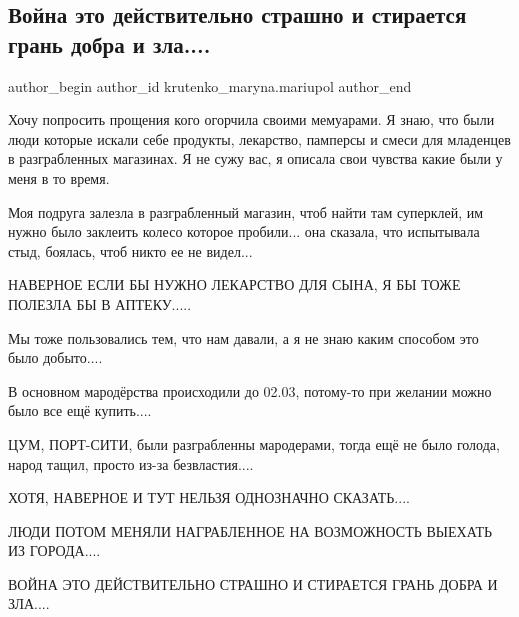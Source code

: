  
 
 
 
 

\subsection{Война это действительно страшно и стирается грань добра и зла....}
\label{sec:18_03_2023.fb.krutenko_maryna.mariupol.1.voina_eto_deistvitel}

\ifcmt
 author_begin
   author_id krutenko_maryna.mariupol
 author_end
\fi

Хочу попросить прощения кого огорчила своими мемуарами. Я знаю, что были люди
которые искали себе продукты, лекарство, памперсы и смеси для младенцев в
разграбленных магазинах. Я не сужу вас, я описала свои чувства какие были у
меня в то время. 

Моя подруга залезла в разграбленный магазин, чтоб найти там суперклей, им нужно
было заклеить колесо которое пробили... она сказала, что испытывала стыд,
боялась, чтоб никто ее не видел...  

НАВЕРНОЕ ЕСЛИ БЫ НУЖНО ЛЕКАРСТВО ДЛЯ СЫНА, Я БЫ ТОЖЕ ПОЛЕЗЛА БЫ В АПТЕКУ.....

Мы тоже пользовались тем, что нам давали, а я не знаю каким способом это было
добыто....

В основном мародёрства происходили до 02.03, потому-то при желании можно было
все ещё купить....

ЦУМ, ПОРТ-СИТИ, были разграбленны мародерами, тогда ещё не было голода, народ
тащил, просто из-за безвластия.... 

ХОТЯ, НАВЕРНОЕ И ТУТ НЕЛЬЗЯ ОДНОЗНАЧНО СКАЗАТЬ....

ЛЮДИ ПОТОМ МЕНЯЛИ НАГРАБЛЕННОЕ НА ВОЗМОЖНОСТЬ ВЫЕХАТЬ ИЗ ГОРОДА....

ВОЙНА ЭТО ДЕЙСТВИТЕЛЬНО СТРАШНО И СТИРАЕТСЯ ГРАНЬ ДОБРА И ЗЛА....


